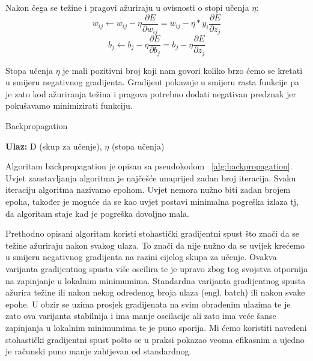 \documentclass[times, utf8, zavrsni, numeric]{fer}
\begin{document}
Nakon čega se težine i pragovi ažuriraju u ovisnosti o stopi učenja $\eta$:
\begin{equation}\label{eq:azuriraj-w}
w_{ij} \leftarrow w_{ij} - \eta\dfrac{\partial E}{\partial w_{ij}} = w_{ij} - \eta * y_i  \dfrac{\partial E}{\partial z_j}
\end{equation}
\begin{equation}\label{eq:azuriraj-b}
b_{j} \leftarrow b_{j} - \eta\dfrac{\partial E}{\partial b_{j}} = b_{j} - \eta \dfrac{\partial E}{\partial z_j}
\end{equation}

Stopa učenja $\eta$ je mali pozitivni broj koji nam govori koliko brzo ćemo se kretati u smijeru negativnog gradijenta. Gradijent pokazuje u smijeru rasta funkcije pa je zato kod ažuriranja težina i pragova potrebno dodati negativan predznak jer pokušavamo minimizirati funkciju.

\begin{algorithm}
\caption{Backpropagation}
\label{alg:backpropagation}
\begin{algorithmic}
\STATE \textbf{Ulaz:} D (skup za učenje), $\eta$ (stopa učenja)
\ENDFOR
\ENDFOR
\ENDWHILE
\end{algorithmic}
\end{algorithm}

Algoritam backpropagation je opisan sa pseudokodom ~\ref{alg:backpropagation}. Uvjet zaustavljanja algoritma je najčešće unaprijed zadan broj iteracija. Svaku iteraciju algoritma nazivamo epohom. Uvjet nemora nužno biti zadan brojem epoha, također je moguće da se kao uvjet postavi minimalna pogreška izlaza tj, da algoritam staje kad je pogreška dovoljno mala.

Prethodno opisani algoritam koristi stohastički gradijentni spust što znači da se težine ažuriraju nakon svakog ulaza. To znači da nije nužno da se uvijek krećemo u smijeru negativnog gradijenta na razini cijelog skupa za učenje. Ovakva varijanta gradijentnog spusta više oscilira te je upravo zbog tog svojstva otpornija na zapinjanje u lokalnim minimumima. Standardna varijanta gradijentnog spusta ažurira težine ili nakon nekog određenog broja ulaza (engl. batch) ili nakon svake epohe. U obzir se uzima prosjek gradijenata na svim obrađenim ulazima te je zato ova varijanta stabilnija i ima manje oscilacije ali zato ima veće šanse zapinjanja u lokalnim minimumima te je puno sporija. Mi ćemo koristiti navedeni stohastički gradijentni spust pošto se u praksi pokazao veoma efikasnim a ujedno je računski puno manje zahtjevan od standardnog.
\end{document}
